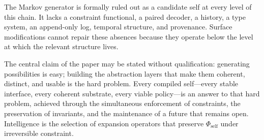 \documentclass[12pt, a4paper]{article}
\theoremstyle{plain}
\theoremstyle{definition}
\theoremstyle{remark}
\begin{document}
The Markov generator is formally ruled out as a candidate self at every level of this chain. It lacks a constraint functional, a paired decoder, a history, a type system, an append-only log, temporal structure, and provenance. Surface modifications cannot repair these absences because they operate below the level at which the relevant structure lives.

The central claim of the paper may be stated without qualification: generating possibilities is easy; building the abstraction layers that make them coherent, distinct, and usable is the hard problem. Every compiled self---every stable interface, every coherent substrate, every viable policy---is an answer to that hard problem, achieved through the simultaneous enforcement of constraints, the preservation of invariants, and the maintenance of a future that remains open. Intelligence is the selection of expansion operators that preserve $\Phi_{\mathrm{self}}$ under irreversible constraint.
\end{document}

